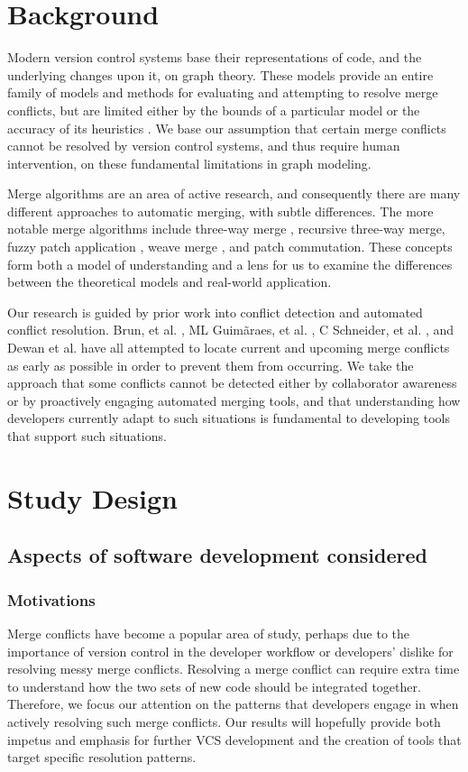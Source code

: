 \documentclass{sig-alternate-05-2015}
\begin{document}
\section{Background}\label{Background}

Modern version control systems base their representations of code, and the underlying changes upon it, on graph theory. These models provide an entire family of models and methods for evaluating and attempting to resolve merge conflicts, but are limited either by the bounds of a particular model or the accuracy of its heuristics \cite{ehrig15} \cite{mens99}. We base our assumption that certain merge conflicts cannot be resolved by version control systems, and thus require human intervention, on these fundamental limitations in graph modeling.

Merge algorithms are an area of active research, and consequently there are many different approaches to automatic merging, with subtle differences. The more notable merge algorithms include three-way merge \cite{livshits07}, recursive three-way merge, fuzzy patch application \cite{brunet06}, weave merge \cite{nguyen07}, and patch commutation. These concepts form both a model of understanding and a lens for us to examine the differences between the theoretical models and real-world application.

Our research is guided by prior work into conflict detection and automated conflict resolution. Brun, et al. \cite{brun11}, ML Guim\~{a}raes, et al. \cite{Guimaraes12}, C Schneider, et al. \cite{schneider04}, and Dewan et al. \cite{dewan07} have all attempted to locate current and upcoming merge conflicts as early as possible in order to prevent them from occurring. We take the approach that some conflicts cannot be detected either by collaborator awareness or by proactively engaging automated merging tools, and that understanding how developers currently adapt to such situations is fundamental to developing tools that support such situations.\\

\section{Study Design}\label{design}
\subsection{Aspects of software development considered} 
\subsubsection{Motivations}
Merge conflicts have become a popular area of study, perhaps due to the importance of version control in the developer workflow or developers' dislike for resolving messy merge conflicts. Resolving a merge conflict can require extra time to understand how the two sets of new code should be integrated together. Therefore, we focus our attention on the patterns that developers engage in when actively resolving such merge conflicts. Our results will hopefully provide both impetus and emphasis for further VCS development and the creation of tools that target specific resolution patterns.
\end{document}
